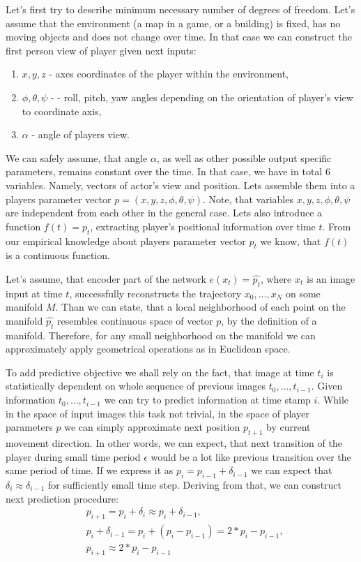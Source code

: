 Let's first try to describe minimum necessary number of degrees of freedom.
Let's assume that the environment (a map in a game, or a building) is fixed, has no moving objects and does not change over time.
In that case we can construct the first person view of player given next inputs:
\begin{enumerate}
  \item $x, y, z$ - axes coordinates of the player within the environment,
  \item $\phi, \theta, \psi$ -  - roll, pitch, yaw angles depending on the orientation of player's view to coordinate axis,
  \item $\alpha$ - angle of players view.
\end{enumerate}

We can safely assume, that angle $\alpha$, as well as other possible output specific parameters, remains constant over the time.
In that case, we have in total 6 variables.
Namely, vectors of actor's view and position.
Lets assemble them into a players parameter vector $p=(x, y, z, \phi, \theta, \psi)$.
Note, that variables $x, y, z, \phi, \theta, \psi$ are independent from each other in the general case.
Lets also introduce a function $f(t)=p_t$, extracting player's positional information over time $t$.
From our empirical knowledge about players parameter vector $p_t$ we know, that $f(t)$ is a continuous function.

Let's assume, that encoder part of the network $e(x_t)= \hat{p_t}$, where $x_t$ is an image input at time $t$, successfully reconstructs the trajectory ${x_0, \ldots, x_N}$ on some manifold $M$.
Than we can state, that a local neighborhood of each point on the manifold $\hat{p_t}$ resembles continuous space of vector $p$, by the definition of a manifold.
Therefore, for any small neighborhood on the manifold we can approximately apply geometrical operations as in Euclidean space.

To add predictive objective we shall rely on the fact, that image at time $t_i$ is statistically dependent on whole sequence of previous images ${t_0, \ldots, t_{i-1}}$.
Given information ${t_0, \ldots, t_{i-1}}$ we can try to predict information at time stamp $i$.
While in the space of input images this task not trivial, in the space of player parameters $p$ we can simply approximate next position $p_{t+1}$ by current movement direction.
In other words, we can expect, that next transition of the player during small time period $\epsilon$ would be a lot like previous transition over the same period of time.
If we express it as $p_i = p_{i-1} + \delta_{i-1}$ we can expect that $\delta_i \approx \delta_{i-1}$ for sufficiently small time step. Deriving from that, we can construct next prediction procedure:
\begin{equation}
  \begin{aligned}
    &p_{i+1} = p_i + \delta_i \approx p_i + \delta_{i-1},\\
    &p_i + \delta_{i-1} = p_i + (p_i - p_{i-1}) = 2*p_i - p_{i-1}, \\
    &p_{i+1} \approx 2*p_i - p_{i-1}
  \end{aligned}
\end{equation}

